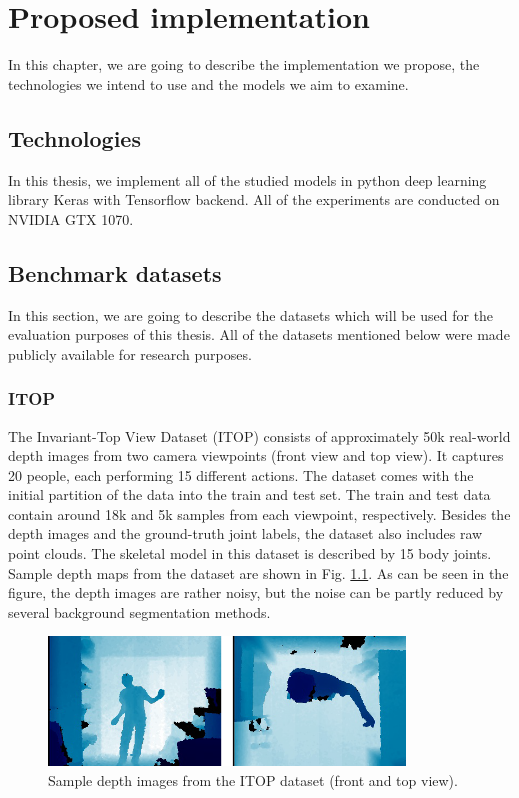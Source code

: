 \chapter{Proposed implementation}\label{chap:proposal}
In this chapter, we are going to describe the implementation we propose, the technologies we intend to use and the models we aim to examine.


\section{Technologies}
In this thesis, we implement all of the studied models in python deep learning library Keras with Tensorflow backend. All of the experiments are conducted on NVIDIA GTX 1070.

\section{Benchmark datasets}

In this section, we are going to describe the datasets which will be used for the evaluation purposes of this thesis. All of the datasets mentioned below were made publicly available for research purposes.
\subsection{ITOP}
The Invariant-Top View Dataset (ITOP) \cite{haque2016viewpoint} consists of approximately 50k real-world depth images from two camera viewpoints (front view and top view). It captures 20 people, each performing 15 different actions. The dataset comes with the initial partition of the data into the train and test set. The train and test data contain around 18k and 5k samples from each viewpoint, respectively. Besides the depth images and the ground-truth joint labels, the dataset also includes raw point clouds. The skeletal model in this dataset is described by 15 body joints. Sample depth maps from the dataset are shown in Fig. \ref{fig:itop}. As can be seen in the figure, the depth images are rather noisy, but the noise can be partly reduced by several background segmentation methods.\par

\vspace{5mm}
\begin{figure}[H]
\begin{center}
  \includegraphics[height=130px]{images/implementation/itop.png}
  \caption[Sample depth images from the ITOP dataset \cite{haque2016viewpoint}.]{Sample depth images from the ITOP dataset \cite{haque2016viewpoint} (front and top view).}
  \label{fig:itop}
\end{center}
\end{figure}

